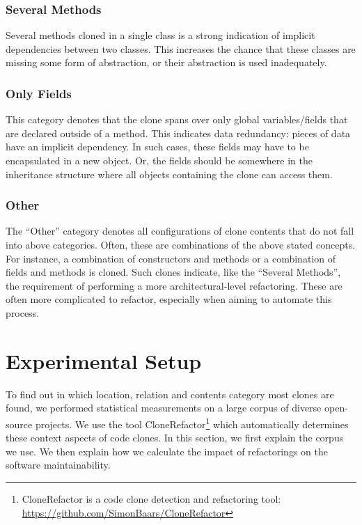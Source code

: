 \documentclass[runningheads]{llncs}
\begin{document}
\subsubsection{Several Methods}
Several methods cloned in a single class is a strong indication of implicit dependencies between two classes. This increases the chance that these classes are missing some form of abstraction, or their abstraction is used inadequately. %

\subsubsection{Only Fields}
This category denotes that the clone spans over only global variables/fields that are declared outside of a method. This indicates data redundancy: pieces of data have an implicit dependency. In such cases, these fields may have to be encapsulated in a new object. Or, the fields should be somewhere in the inheritance structure where all objects containing the clone can access them. %

\subsubsection{Other}
The ``Other'' category denotes all configurations of clone contents that do not fall into above categories. Often, these are combinations of the above stated concepts. For instance, a combination of constructors and methods or a combination of fields and methods is cloned. Such clones indicate, like the ``Several Methods'', the requirement of performing a more architectural-level refactoring. These are often more complicated to refactor, especially when aiming to automate this process.

\section{Experimental Setup}
To find out in which location, relation and contents category most clones are found, we performed statistical measurements on a large corpus of diverse open-source projects. We use the tool CloneRefactor\footnote{CloneRefactor is a code clone detection and refactoring tool: \url{https://github.com/SimonBaars/CloneRefactor}} which automatically determines these context aspects of code clones. In this section, we first explain the corpus we use. We then explain how we calculate the impact of refactorings on the software maintainability.
\end{document}
